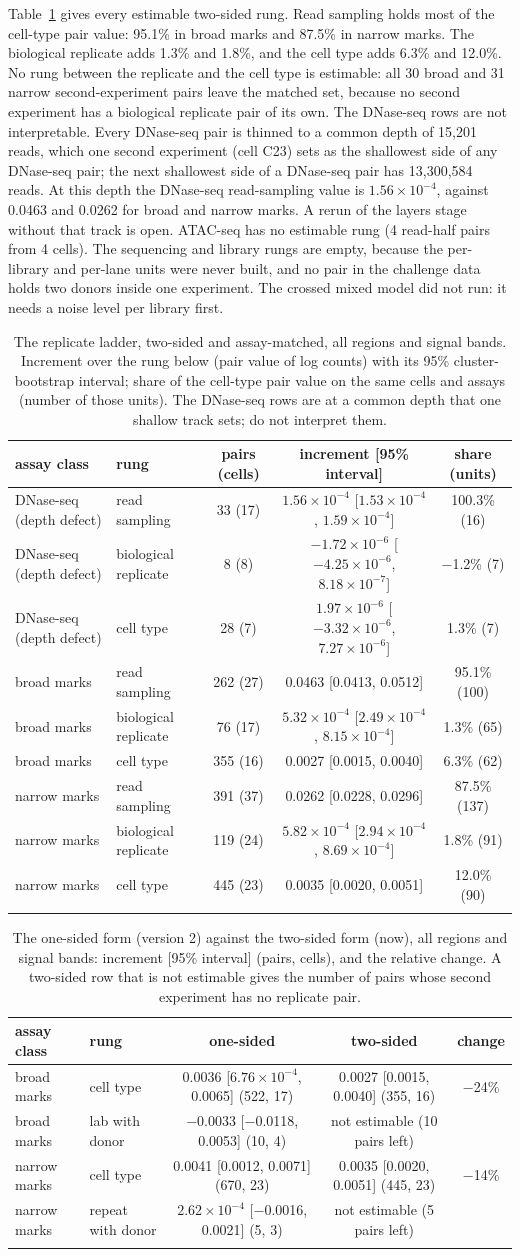 \documentclass[pdflatex,sn-mathphys-num]{sn-jnl}
\newcommand{\lit}[1]{#1}
\newcommand{\cl}[1]{#1}
\newcommand{\TabLadder}{DNase-seq (depth defect) & read sampling & 33 (17) & \ensuremath{1.56\times10^{-4}} [\ensuremath{1.53\times10^{-4}}, \ensuremath{1.59\times10^{-4}}] & 100.3\% (16) \\
DNase-seq (depth defect) & biological replicate & 8 (8) & \ensuremath{-1.72\times10^{-6}} [\ensuremath{-4.25\times10^{-6}}, \ensuremath{8.18\times10^{-7}}] & \ensuremath{-}1.2\% (7) \\
DNase-seq (depth defect) & cell type & 28 (7) & \ensuremath{1.97\times10^{-6}} [\ensuremath{-3.32\times10^{-6}}, \ensuremath{7.27\times10^{-6}}] & 1.3\% (7) \\
broad marks & read sampling & 262 (27) & 0.0463 [0.0413, 0.0512] & 95.1\% (100) \\
broad marks & biological replicate & 76 (17) & \ensuremath{5.32\times10^{-4}} [\ensuremath{2.49\times10^{-4}}, \ensuremath{8.15\times10^{-4}}] & 1.3\% (65) \\
broad marks & cell type & 355 (16) & 0.0027 [0.0015, 0.0040] & 6.3\% (62) \\
narrow marks & read sampling & 391 (37) & 0.0262 [0.0228, 0.0296] & 87.5\% (137) \\
narrow marks & biological replicate & 119 (24) & \ensuremath{5.82\times10^{-4}} [\ensuremath{2.94\times10^{-4}}, \ensuremath{8.69\times10^{-4}}] & 1.8\% (91) \\
narrow marks & cell type & 445 (23) & 0.0035 [0.0020, 0.0051] & 12.0\% (90) \\}
\newcommand{\TabLadderForms}{broad marks & cell type & 0.0036 [\ensuremath{6.76\times10^{-4}}, 0.0065] (522, 17) & 0.0027 [0.0015, 0.0040] (355, 16) & \ensuremath{-}24\% \\
broad marks & lab with donor & \ensuremath{-}0.0033 [\ensuremath{-}0.0118, 0.0053] (10, 4) & not estimable (10 pairs left) &  \\
narrow marks & cell type & 0.0041 [0.0012, 0.0071] (670, 23) & 0.0035 [0.0020, 0.0051] (445, 23) & \ensuremath{-}14\% \\
narrow marks & repeat with donor & \ensuremath{2.62\times10^{-4}} [\ensuremath{-}0.0016, 0.0021] (5, 3) & not estimable (5 pairs left) &  \\}
\newcommand{\ladAtacC}{4}
\newcommand{\ladAtacN}{4}
\newcommand{\ladBrCt}{6.3\%}
\newcommand{\ladBrOeAll}{30}
\newcommand{\ladBrRep}{1.3\%}
\newcommand{\ladBrSamp}{95.1\%}
\newcommand{\ladBrSampV}{0.0463}
\newcommand{\ladDnCell}{C23}
\newcommand{\ladDnDepth}{15{,}201}
\newcommand{\ladDnNext}{13{,}300{,}584}
\newcommand{\ladDnSampV}{\ensuremath{1.56\times10^{-4}}}
\newcommand{\ladNrCt}{12.0\%}
\newcommand{\ladNrOeAll}{31}
\newcommand{\ladNrRep}{1.8\%}
\newcommand{\ladNrSamp}{87.5\%}
\newcommand{\ladNrSampV}{0.0262}
\begin{document}
\cl{Table~\ref{tab:ladder} gives every estimable two-sided rung. Read sampling holds most of the cell-type pair value: \ladBrSamp{} in broad marks and \ladNrSamp{} in narrow marks. The biological replicate adds \ladBrRep{} and \ladNrRep{}, and the cell type adds \ladBrCt{} and \ladNrCt{}. No rung between the replicate and the cell type is estimable: all \ladBrOeAll{} broad and \ladNrOeAll{} narrow second-experiment pairs leave the matched set, because no second experiment has a biological replicate pair of its own. The DNase-seq rows are not interpretable. Every DNase-seq pair is thinned to a common depth of \ladDnDepth{} reads, which one second experiment (cell \ladDnCell{}) sets as the shallowest side of any DNase-seq pair; the next shallowest side of a DNase-seq pair has \ladDnNext{} reads. At this depth the DNase-seq read-sampling value is \ladDnSampV{}, against \ladBrSampV{} and \ladNrSampV{} for broad and narrow marks. A rerun of the layers stage without that track is open. ATAC-seq has no estimable rung (\ladAtacN{} read-half pairs from \ladAtacC{} cells). The sequencing and library rungs are empty, because the per-library and per-lane units were never built, and no pair in the challenge data holds two donors inside one experiment. The crossed mixed model did not run: it needs a noise level per library first.}

\begin{table}[!htbp]
\caption{\cl{The replicate ladder, two-sided and assay-matched, all regions and signal bands. Increment over the rung below (pair value of log counts) with its \lit{95}\% cluster-bootstrap interval; share of the cell-type pair value on the same cells and assays (number of those units). The DNase-seq rows are at a common depth that one shallow track sets; do not interpret them.}}\label{tab:ladder}
\scriptsize
\setlength{\tabcolsep}{3.5pt}
\begin{tabular}{llccc}
\toprule
assay class & rung & pairs (cells) & increment [\lit{95}\% interval] & share (units) \\
\midrule
\TabLadder
\botrule
\end{tabular}
\end{table}

\begin{table}[!htbp]
\caption{\cl{The one-sided form (version \lit{2}) against the two-sided form (now), all regions and signal bands: increment [\lit{95}\% interval] (pairs, cells), and the relative change. A two-sided row that is not estimable gives the number of pairs whose second experiment has no replicate pair.}}\label{tab:ladderforms}
\scriptsize
\setlength{\tabcolsep}{3.5pt}
\begin{tabular}{llccc}
\toprule
assay class & rung & one-sided & two-sided & change \\
\midrule
\TabLadderForms
\botrule
\end{tabular}
\end{table}
\end{document}
